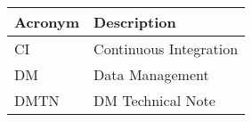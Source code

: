 \addtocounter{table}{-1}
\begin{longtable}{p{}p{}}\hline
\textbf{Acronym} & \textbf{Description}  \\\hline

CI & Continuous Integration \\\hline
DM & Data Management \\\hline
DMTN & DM Technical Note \\\hline
\end{longtable}
